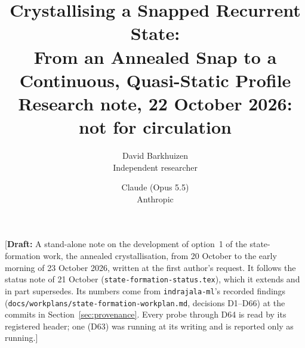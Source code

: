 \documentclass[11pt]{article}
\title{Crystallising a Snapped Recurrent State:\\From an Annealed Snap to a Continuous, Quasi-Static Profile\\[0.5em]
\large Research note, 22 October 2026: not for circulation}
\author{
  David Barkhuizen\\
  Independent researcher
  \and
  Claude (Opus 5.5)\\
  Anthropic
}
\date{}
\newcommand{\draftnote}[1]{\textcolor{red!70!black}{[\textbf{Draft:} #1]}}
\begin{document}
\maketitle

\draftnote{A stand-alone note on the development of option~1 of the state-formation work, the
annealed crystallisation, from 20 October to the early morning of 23 October 2026, written at the
first author's request. It follows the status note of 21 October
(\texttt{state-formation-status.tex}), which it extends and in part supersedes. Its numbers come from
\texttt{indrajala-ml}'s recorded findings (\texttt{docs/workplans/state-formation-workplan.md}, decisions
D1--D66) at the commits in Section~\ref{sec:provenance}. Every probe through D64 is read by its
registered header; one (D63) was running at its writing and is reported only as running.}
\end{document}
